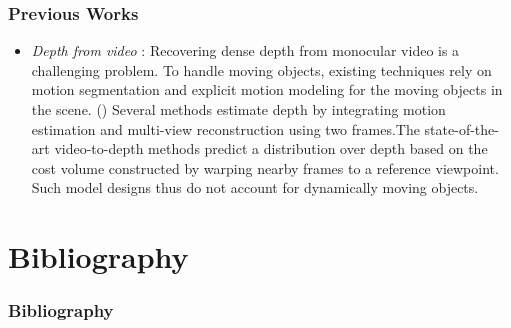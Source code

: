 \documentclass{beamer}
\begin{document}
	\begin{frame}
	\frametitle{Previous Works}
	\begin{itemize}
	
	\item \textit{Depth from video} : Recovering dense depth from monocular video is a challenging problem. To handle moving objects, existing techniques rely on motion segmentation and explicit motion modeling for the moving objects in the scene. 
	(\textcite{casser2019depth})
	Several methods estimate depth by integrating motion estimation and multi-view reconstruction using two frames.The state-of-the-art video-to-depth methods predict a distribution over depth based on the cost volume constructed by warping nearby frames to a reference viewpoint. Such model designs thus do not account for dynamically moving objects.
	\end{itemize}
	
	\end{frame}
	
	\section{Bibliography}
	\begin{frame}
		\frametitle{Bibliography}
		\printbibliography
	\end{frame}
	
\end{document}
